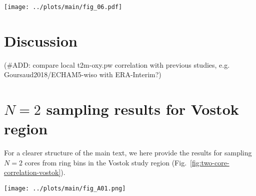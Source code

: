 \documentclass[cp, manuscript]{copernicus}
\begin{document}
\begin{figure*}[t]%
\centering
\texttt{[image: ../plots/main/fig\_06.pdf]}
\caption{%
  The optimal arrangement for averaging three or five
  $\delta^{18}\mathrm{O}^{\mathrm{(pw)}}$ ice cores to reconstruct the target
  site temperature at the EDML (\textbf{a}, \textbf{c}) and Vostok (\textbf{b},
  \textbf{d}) drilling sites. Displayed are the optimal five of all possible
  combinations of ring bins, i.e. those which exhibit the highest mean
  correlation across $10^5$ random trials of averaging $N=3$ (\textbf{c},
  \textbf{d}) or $N=5$ (\textbf{a}, \textbf{b}) grid cells from these rings.}
\label{fig:binning}%
\end{figure*}%

\section{Discussion}\label{discussion}

(\#ADD: compare local t2m-oxy.pw correlation with previous studies,
e.g. Goursaud2018/ECHAM5-wiso with ERA-Interim?)


\appendix

\section{$N=2$ sampling results for Vostok region}
\label{app:vostok.n2}

For a clearer structure of the main text, we here provide the results for
sampling $N=2$ cores from ring bins in the Vostok study region
(Fig.~\ref{fig:two-core-correlation-vostok}).

\begin{figure*}[t]%
\centering
\texttt{[image: ../plots/main/fig\_A01.png]}
\caption{%
  The expected correlation with the target site temperature for the average of
  two cores in the Vostok region. Shown is the mean correlation of all possible
  single correlations from averaging two grid cells of (\textbf{a})
  $T_{\mathrm{2m}}$, (\textbf{b}) $T_{\mathrm{2m}}^{\mathrm{(pw)}}$ and
  (\textbf{c}) $\delta^{18}\mathrm{O}^{\mathrm{(pw)}}$ time series sampled from
  the same or from two different ring bins, averaged over all target sites in
  the given region. The axes display the distance from the target, where the $x$
  ($y$) axis stands for the first (second) sampled ring bin and tickmarks
  indicate the radius of the midpoints of the ring bins.}
\label{fig:two-core-correlation-vostok}%
\end{figure*}%
\end{document}
